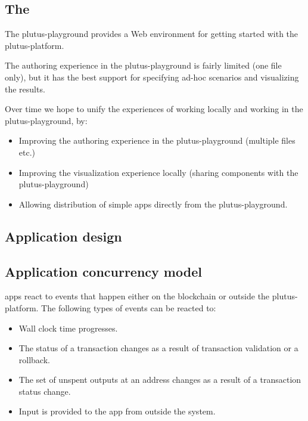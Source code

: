 \subsection{The }
\label{sec:plutus-playground}

The \gls{plutus-playground} provides a Web environment for getting started with the \gls{plutus-platform}.

The authoring experience in the \gls{plutus-playground} is fairly limited (one file only), but it has the best support for specifying ad-hoc scenarios and visualizing the results.

Over time we hope to unify the experiences of working locally and working in the \gls{plutus-playground}, by:
\begin{itemize}
\item Improving the authoring experience in the \gls{plutus-playground} (multiple files etc.)
\item Improving the visualization experience locally (sharing components with the \gls{plutus-playground})
\item Allowing distribution of simple \glspl{app} directly from the \gls{plutus-playground}.
\end{itemize}

\subsection{Application design}


\subsection{Application concurrency model}

\glspl{app} react to events that happen either on the blockchain or outside the \gls{plutus-platform}.
The following types of events can be reacted to:
\begin{itemize}
  \item Wall clock time progresses.
  \item The status of a transaction changes as a result of transaction validation or a rollback.
  \item The set of unspent outputs at an address changes as a result of a transaction status change.
  \item Input is provided to the \gls{app} from outside the system.
\end{itemize}

